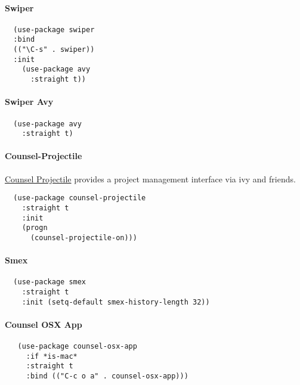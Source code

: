 \documentclass[11pt]{article}
\begin{document}
\paragraph*{Swiper}
\label{sec:org44dd635}

\begin{verbatim}
  (use-package swiper
  :bind
  (("\C-s" . swiper))
  :init
    (use-package avy
      :straight t))
\end{verbatim}

\paragraph*{Swiper Avy}
\label{sec:org30195f1}

\begin{verbatim}
  (use-package avy
    :straight t)
\end{verbatim}

\paragraph*{Counsel-Projectile}
\label{sec:orgbe8bbd4}

\href{https://github.com/ericdanan/counsel-projectile}{Counsel Projectile} provides a project management interface via ivy and
friends.

\begin{verbatim}
  (use-package counsel-projectile
    :straight t
    :init
    (progn
      (counsel-projectile-on)))
\end{verbatim}

\paragraph*{Smex}
\label{sec:orgb90303f}

\begin{verbatim}
  (use-package smex
    :straight t
    :init (setq-default smex-history-length 32))
\end{verbatim}

\paragraph*{Counsel OSX App}
\label{sec:orgb35e437}

\begin{verbatim}
   (use-package counsel-osx-app
     :if *is-mac*
     :straight t
     :bind (("C-c o a" . counsel-osx-app)))
\end{verbatim}
\end{document}
